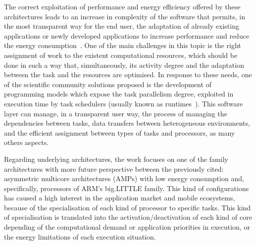 The correct exploitation of performance and energy efficiency offered by
these architectures leads to an increase in complexity of the software that
permits, in the most transparent way for the end user, the adaptation of
already existing applications or newly developed applications to increase
performance and reduce the energy consumption~\cite{OsTo10, SKC+15}. One of
the main challenges in this topic is the right assignment of work to the
existent computational resources, which should be done in such a way that,
simultaneously, its activity degree and the adaptation between the task and
the resources are optimised. In response to these needs, one of the
scientific community solutions proposed is the development of programming
models which expose the task parallelism degree, exploited in execution
time by task schedulers (usually known as runtimes~\cite{VMC+14}).  This
software layer can manage, in a transparent user way, the process of
managing the dependencies between tasks, data transfers between
heterogeneous environments, and the efficient assignment between types of
tasks and processors, as many others aspects.


Regarding underlying architectures, the work focuses on one of the family
architectures with more future perspective between the previously cited:
asymmetric multicore architectures (AMPs) with low energy consumption and,
specifically, processors of ARM's big.LITTLE family. This kind of
configurations has caused a high interest in the application market and
mobile ecosystems, because of the specialisation of each kind of processor
to specific tasks. This kind of specialisation is translated into the
activation/deactivation of each kind of core depending of the computational
demand or application priorities in execution, or the energy limitations of
each execution situation. 

